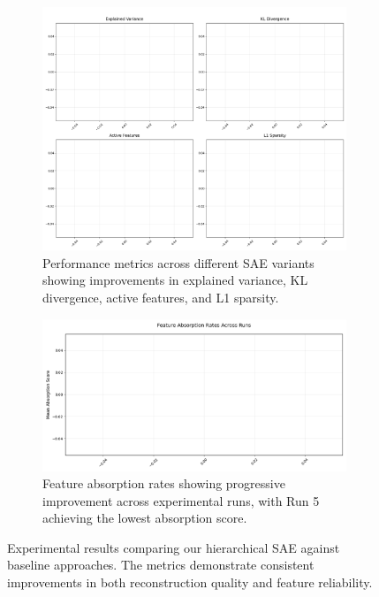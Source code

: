 \documentclass{article} %
\begin{document}
\begin{figure}[h]
    \centering
    \begin{subfigure}{0.49\textwidth}
        \includegraphics[width=\textwidth]{metrics_comparison.png}
        \caption{Performance metrics across different SAE variants showing improvements in explained variance, KL divergence, active features, and L1 sparsity.}
        \label{fig:metrics}
    \end{subfigure}
    \hfill
    \begin{subfigure}{0.49\textwidth}
        \includegraphics[width=\textwidth]{absorption_rates.png}
        \caption{Feature absorption rates showing progressive improvement across experimental runs, with Run 5 achieving the lowest absorption score.}
        \label{fig:absorption}
    \end{subfigure}
    \caption{Experimental results comparing our hierarchical SAE against baseline approaches. The metrics demonstrate consistent improvements in both reconstruction quality and feature reliability.}
    \label{fig:results}
\end{figure}
\end{document}
